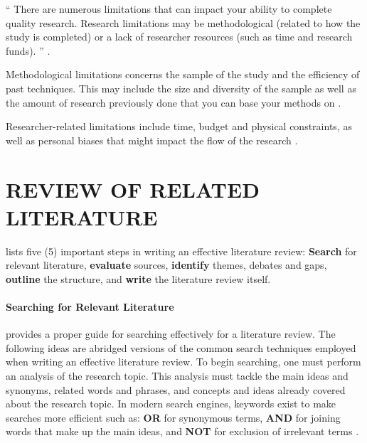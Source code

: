 \documentclass{strrespaper-trad}
\begin{document}
			\enquote{%
				There are numerous limitations that can impact your ability to complete quality research.
				Research limitations may be methodological (related to how the study is completed) or a lack of researcher resources (such as time and research funds).%
			} \autocite{askmediagroupWhatAreScope2020}.

			Methodological limitations concerns the sample of the study and the efficiency of past techniques. This may include the size and diversity of the sample as well as the amount of research previously done that you can base your methods on \autocite{askmediagroupWhatAreScope2020}.

			Researcher-related limitations include time, budget and physical constraints, as well as personal biases that might impact the flow of the research \autocite{askmediagroupWhatAreScope2020}.


	\section{REVIEW OF RELATED LITERATURE}
		\textcite{mccombesLiteratureReviewComplete2019} lists five (5) important steps in writing an effective literature review: \textbf{Search} for relevant literature, \textbf{evaluate} sources, \textbf{identify} themes, debates and gaps, \textbf{outline} the structure, and \textbf{write} the literature review itself.

		\paragraph{Searching for Relevant Literature}
			\textcite{hardyGuidesLiteratureReview2020} provides a proper guide for searching effectively for a literature review.
			The following ideas are abridged versions of the common search techniques employed when writing an effective literature review.
			To begin searching, one must perform an analysis of the research topic.
			This analysis must tackle the main ideas and synonyms, related words and phrases, and concepts and ideas already covered about the research topic.
			In modern search engines, keywords exist to make searches more efficient such as: \textbf{OR} for synonymous terms, \textbf{AND} for joining words that make up the main ideas, and \textbf{NOT} for exclusion of irrelevant terms \autocite{hardyGuidesLiteratureReview2020}.
\end{document}
